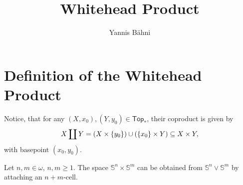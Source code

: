 

\title{Whitehead Product}
\author{Yannis B\"{a}hni}
\address[Yannis B\"{a}hni]{University of Zurich, R\"{a}mistrasse 71, 8006 Zurich}



\begin{abstract}
\end{abstract}

\maketitle

\tableofcontents

\section{Definition of the Whitehead Product}
Notice, that for any $(X,x_0),(Y,y_0) \in \mathsf{Top}_*$, their coproduct is given by
\begin{equation*}
	X \coprod Y = (X \times \cbr[0]{y_0}) \cup (\cbr[0]{x_0} \times Y) \subseteq X \times Y,
\end{equation*}
\noindent with basepoint $(x_0,y_0)$. 

\begin{lemma}
	\label{lem:attaching_cell_wedge_sum_spheres}
	Let $n,m \in \omega$, $n,m \geq 1$. The space $\mathbb{S}^n \times \mathbb{S}^m$ can be obtained from $\mathbb{S}^n \vee \mathbb{S}^m$ by attaching an $n + m$-cell.
\end{lemma}

